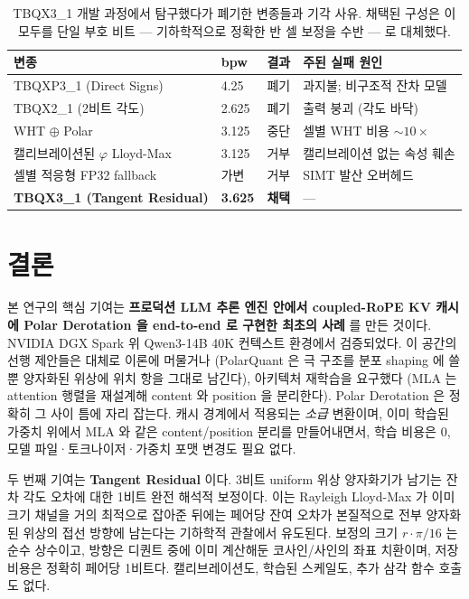 \documentclass[10pt,twocolumn]{article}
\begin{document}
\begin{table}[t]
\centering
\small
\begin{tabular}{@{}llll@{}}
\toprule
\textbf{변종} & \textbf{bpw} & \textbf{결과} & \textbf{주된 실패 원인} \\
\midrule
TBQXP3\_1 (Direct Signs)            & 4.25 & 폐기 & 과지불; 비구조적 잔차 모델 \\
TBQX2\_1 (2비트 각도)              & 2.625 & 폐기 & 출력 붕괴 (각도 바닥) \\
WHT $\oplus$ Polar                  & 3.125 & 중단 & 셀별 WHT 비용 $\sim 10\times$ \\
캘리브레이션된 $\varphi$ Lloyd-Max  & 3.125 & 거부 & 캘리브레이션 없는 속성 훼손 \\
셀별 적응형 FP32 fallback          & 가변  & 거부 & SIMT 발산 오버헤드 \\
\midrule
\textbf{TBQX3\_1 (Tangent Residual)} & \textbf{3.625} & \textbf{채택} & --- \\
\bottomrule
\end{tabular}
\caption{TBQX3\_1 개발 과정에서 탐구했다가 폐기한 변종들과 기각 사유. 채택된 구성은 이 모두를 단일 부호 비트 --- 기하학적으로 정확한 반 셀 보정을 수반 --- 로 대체했다.}
\label{tab:deadends}
\end{table}

\section{결론}
\label{sec:conclusion}

본 연구의 핵심 기여는 \textbf{프로덕션 LLM 추론 엔진 안에서 coupled-RoPE KV 캐시에 Polar Derotation 을 end-to-end 로 구현한 최초의 사례} 를 만든 것이다. NVIDIA DGX Spark 위 Qwen3-14B 40K 컨텍스트 환경에서 검증되었다. 이 공간의 선행 제안들은 대체로 이론에 머물거나 (PolarQuant 은 극 구조를 분포 shaping 에 쓸 뿐 양자화된 위상에 위치 항을 그대로 남긴다), 아키텍처 재학습을 요구했다 (MLA 는 attention 행렬을 재설계해 content 와 position 을 분리한다). Polar Derotation 은 정확히 그 사이 틈에 자리 잡는다. 캐시 경계에서 적용되는 \emph{소급} 변환이며, 이미 학습된 가중치 위에서 MLA 와 같은 content/position 분리를 만들어내면서, 학습 비용은 0, 모델 파일·토크나이저·가중치 포맷 변경도 필요 없다.

두 번째 기여는 \textbf{Tangent Residual} 이다. 3비트 uniform 위상 양자화기가 남기는 잔차 각도 오차에 대한 1비트 완전 해석적 보정이다. 이는 Rayleigh Lloyd-Max 가 이미 크기 채널을 거의 최적으로 잡아준 뒤에는 페어당 잔여 오차가 본질적으로 전부 양자화된 위상의 접선 방향에 남는다는 기하학적 관찰에서 유도된다. 보정의 크기 $r\cdot\pi/16$ 는 순수 상수이고, 방향은 디퀀트 중에 이미 계산해둔 코사인/사인의 좌표 치환이며, 저장 비용은 정확히 페어당 1비트다. 캘리브레이션도, 학습된 스케일도, 추가 삼각 함수 호출도 없다.
\end{document}

